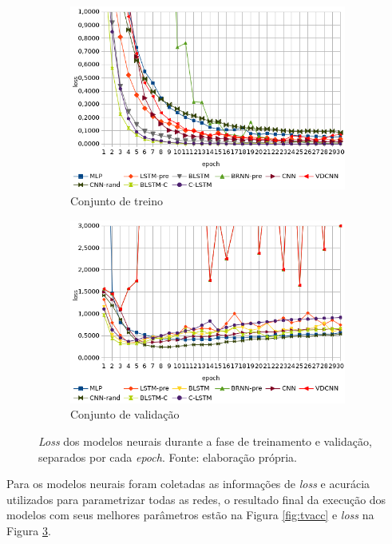 \begin{figure}[ht]
    \centering
    \begin{subfigure}[b]{0.5\textwidth}
        \includegraphics[width=\textwidth]{figuras/treinoloss}
        \caption{Conjunto de treino}
        \label{fig:loss}
    \end{subfigure}\hfill
    \begin{subfigure}[b]{0.5\textwidth}
        \includegraphics[width=\textwidth]{figuras/valloss}
        \caption{Conjunto de validação}
        \label{fig:valloss}
    \end{subfigure}
    \caption[\textit{Loss} dos modelos neurais]{\textit{Loss} dos modelos neurais durante a fase de treinamento e validação, separados por cada \textit{epoch}. Fonte: elaboração própria.}
    \label{fig:tvloss}
\end{figure}


Para os modelos neurais foram coletadas as informações de \textit{loss} e acurácia utilizados para parametrizar todas as redes, o resultado final da execução dos modelos com seus melhores parâmetros estão na Figura \ref{fig:tvacc} e \textit{loss} na Figura \ref{fig:tvloss}.


